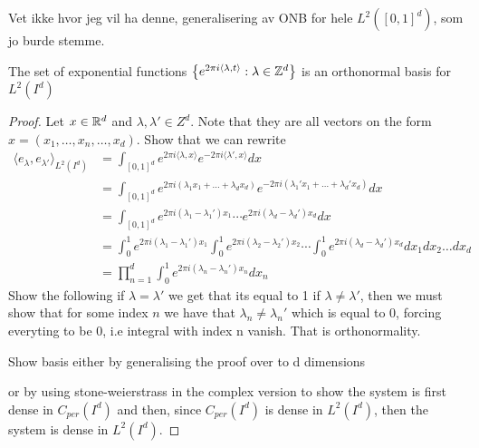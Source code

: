 \documentclass[../thesis.tex]{subfiles}
\begin{document}
Vet ikke hvor jeg vil ha denne, generalisering av ONB for hele $L^2([0,1]^d)$, som jo burde stemme.
\begin{lemma}
    The set of exponential functions $\left\{e^{2\pi i \langle \lambda, t \rangle} : \lambda \in \mathbb{Z}^d\right\}$ is an orthonormal basis for $L^2(I^d)$
\end{lemma}

\begin{proof}
    Let $x\in \mathbb{R}^d$ and $\lambda, \lambda' \in Z^d$. Note that they are all vectors on the form $x=(x_1,\dots, x_n, \dots, x_d)$.
    Show that we can rewrite 
    \begin{align*}
        \langle e_{\lambda},e_{\lambda'} \rangle_{L^2(I^d)} &= \int_{[0,1]^d} e^{2\pi i \langle\lambda, x\rangle} e^{-2 \pi i \langle \lambda', x\rangle} dx \\
        &= \int_{[0,1]^d} e^{2\pi i  (\lambda_1x_1 + \dots +\lambda_d x_d)} e^{-2\pi i  (\lambda_1' x_1 + \dots +\lambda_d' x_d)} dx\\
        &= \int_{[0,1]^d} e^{2\pi i  (\lambda_1 -\lambda_1')x_1} \cdots e^{2\pi i  (\lambda_d -\lambda_d')x_d} dx\\
        &= \int_0^1 e^{2\pi i  (\lambda_1- \lambda_1')x_1} \int_0^1 e^{2\pi i  (\lambda_2 - \lambda_2')x_2}  \cdots \int_0^1 e^{2\pi i  (\lambda_d - \lambda_d')x_d} dx_1 dx_2 \dots dx_d \\
        &=\prod_{n=1}^d \int_0^1 e^{2\pi i  (\lambda_n- \lambda_n')x_n} d x_n 
    \end{align*}
    Show the following 
    if $\lambda = \lambda'$ we get that its equal to 1
    if $\lambda \neq \lambda'$, then we must show that for some index $n$ we have that $\lambda_n \neq \lambda_n'$ which is equal to 0, forcing everyting to be 0, i.e integral with index n vanish.
    That is orthonormality.

    Show basis either by generalising the proof over to d dimensions
    
    or by using stone-weierstrass in the complex version to show the system is first dense in $C_{per}(I^d)$
    and then, since $C_{per}(I^d)$ is dense in $L^2(I^d)$, then the system is dense in $L^2(I^d)$. 

\end{proof}
\end{document}
